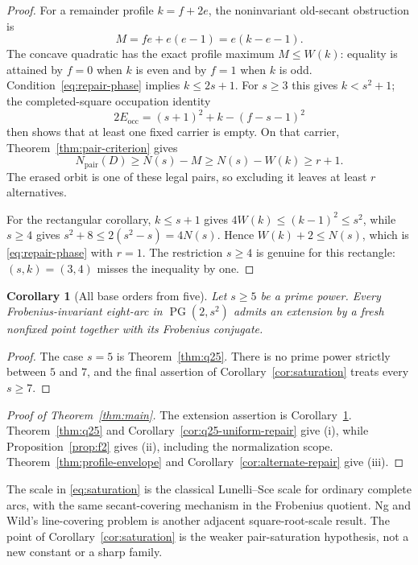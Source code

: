 \documentclass[11pt]{article}
\newtheorem{corollary}[theorem]{Corollary}
\theoremstyle{definition}
\theoremstyle{remark}
\newcommand{\PG}{\operatorname{PG}}
\newcommand{\Npair}{N_{\mathrm{pair}}}
\begin{document}
\begin{proof}
For a remainder profile $k=f+2e$, the noninvariant old-secant obstruction is
\[
  M=f e+e(e-1)=e(k-e-1).
\]
The concave quadratic has the exact profile maximum
$M\le W(k)$: equality is attained by $f=0$ when $k$ is even and by $f=1$
when $k$ is odd.  Condition~\eqref{eq:repair-phase} implies $k\le2s+1$.
For $s\ge3$ this gives $k<s^2+1$; the completed-square occupation identity
\[
  2E_{\mathrm{occ}}=(s+1)^2+k-(f-s-1)^2
\]
then shows that at least one fixed carrier is empty.  On that carrier,
Theorem~\ref{thm:pair-criterion} gives
\[
  \Npair(D)\ge N(s)-M\ge N(s)-W(k)\ge r+1.
\]
The erased orbit is one of these legal pairs, so excluding it leaves at
least $r$ alternatives.

For the rectangular corollary, $k\le s+1$ gives
$4W(k)\le(k-1)^2\le s^2$, while $s\ge4$ gives
$s^2+8\le2(s^2-s)=4N(s)$.  Hence $W(k)+2\le N(s)$, which is
\eqref{eq:repair-phase} with $r=1$.  The restriction $s\ge4$ is genuine for
this rectangle: $(s,k)=(3,4)$ misses the inequality by one.
\end{proof}

\begin{corollary}[All base orders from five]\label{cor:all-orders}
Let $s\ge5$ be a prime power.  Every Frobenius-invariant eight-arc in
$\PG(2,s^2)$ admits an extension by a fresh nonfixed point together with
its Frobenius conjugate.
\end{corollary}

\begin{proof}
The case $s=5$ is Theorem~\ref{thm:q25}.  There is no prime power strictly
between $5$ and $7$, and the final assertion of
Corollary~\ref{cor:saturation} treats every $s\ge7$.
\end{proof}

\begin{proof}[Proof of Theorem~\ref{thm:main}]
The extension assertion is Corollary~\ref{cor:all-orders}.
Theorem~\ref{thm:q25} and Corollary~\ref{cor:q25-uniform-repair} give (i),
while Proposition~\ref{prop:f2} gives (ii), including the normalization
scope.  Theorem~\ref{thm:profile-envelope} and
Corollary~\ref{cor:alternate-repair} give (iii).
\end{proof}

The scale in \eqref{eq:saturation} is the classical Lunelli--Sce scale for
ordinary complete arcs, with the same secant-covering mechanism in the
Frobenius quotient.  Ng and Wild's line-covering problem
\cite{NgWild2001} is another adjacent square-root-scale result.  The point
of Corollary~\ref{cor:saturation} is the weaker pair-saturation hypothesis,
not a new constant or a sharp family.
\end{document}
